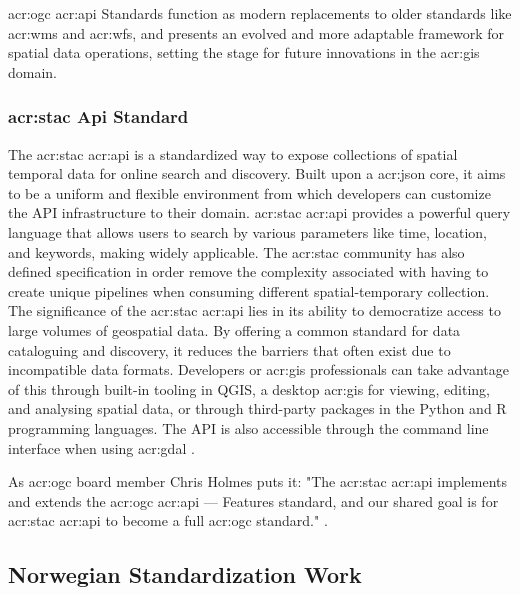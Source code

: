 \acrshort{acr:ogc} \acrshort{acr:api} Standards function as modern replacements to older standards like \acrshort{acr:wms} and \acrshort{acr:wfs}, and presents an evolved and more adaptable framework for spatial data operations, setting the stage for future innovations in the \acrshort{acr:gis} domain.

\subsubsection[STAC Api Standard]{\acrshort{acr:stac} Api Standard}\label{subsubsec:stac}

The \gls{acr:stac} \acrshort{acr:api} is a standardized way to expose collections of spatial temporal data for online search and discovery. Built upon a \acrshort{acr:json} core, it aims to be a uniform and flexible environment from which developers can customize the API infrastructure to their domain. \gls{acr:stac} \acrshort{acr:api} provides a powerful query language that allows users to search by various parameters like time, location, and keywords, making widely applicable. The \acrshort{acr:stac} community has also defined specification in order remove the complexity associated with having to create unique pipelines when consuming different spatial-temporary collection. The significance of the \gls{acr:stac} \acrshort{acr:api} lies in its ability to democratize access to large volumes of geospatial data. By offering a common standard for data cataloguing and discovery, it reduces the barriers that often exist due to incompatible data formats. Developers or \acrshort{acr:gis} professionals can take advantage of this through built-in tooling in QGIS, a desktop \gls{acr:gis} for viewing, editing, and analysing spatial data, or through third-party packages in the Python and R programming languages. The API is also accessible through the command line interface when using \acrshort{acr:gdal} \citep{STACTutorials}.

As \acrshort{acr:ogc} board member Chris Holmes puts it: "The \acrshort{acr:stac} \acrshort{acr:api} implements and extends the \gls{acr:ogc} \acrshort{acr:api} — Features standard, and our shared goal is for \gls{acr:stac} \acrshort{acr:api} to become a full \gls{acr:ogc} standard." \citep{holmesSpatioTemporalAssetCatalogs2021}.

\subsection{Norwegian Standardization Work}\label{subsec:standardization-norway}

